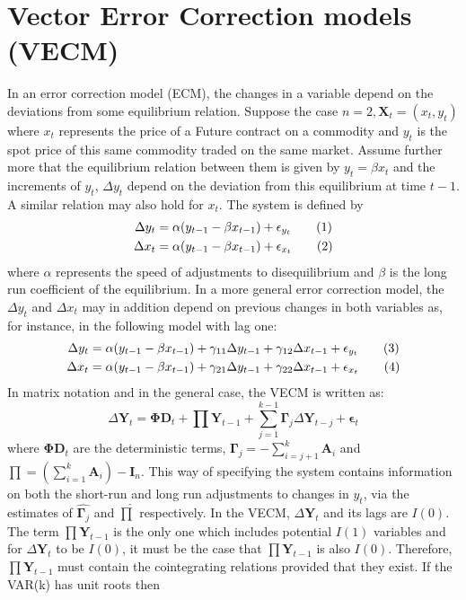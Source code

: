 \documentclass[11pt,a4,twosided,singlespacing,titlepagenumber=on]{scrreprt}
\numberwithin{equation}{chapter} %
\theoremstyle{remark}
\newcommand{\matr}[1]{\mathbf{#1}}
\newcommand\numberthis{\addtocounter{equation}{1}\tag{\theequation}}
\begin{document}
\section{Vector Error Correction models (VECM)}
In an error correction model (ECM), the changes in a variable depend on the deviations from some equilibrium relation. Suppose the case $n=2, \matr{X}_t = (x_t, y_t)$ where $x_t$ represents the price of a Future contract on a commodity and $y_t$ is the spot price of this same commodity traded on the same market. Assume further more that the equilibrium relation between them is given by $y_t = \beta x_t$ and the increments of $y_t$, $\Delta y_t$ depend on the deviation from this equilibrium at time $t-1$. A similar relation may also hold for $x_t$. The system is defined by
\begin{align*}
\Delta y_t &= \alpha (y_{t-1} - \beta x_{t-1}) + \epsilon_{y_t} \numberthis \\
\Delta x_t &= \alpha (y_{t-1} - \beta x_{t-1}) + \epsilon_{x_t} \numberthis
\end{align*}
where $\alpha$ represents the speed of adjustments to disequilibrium and $\beta$ is the long run coefficient of the equilibrium. In a more general error correction model, the $\Delta y_t$ and $\Delta x_t$ may in addition depend on previous changes in both variables as, for instance, in the following model with lag one:
\begin{align*}
\Delta y_t &= \alpha (y_{t-1} - \beta x_{t-1}) + \gamma_{11} \Delta y_{t-1} + \gamma_{12} \Delta x_{t-1} + \epsilon_{y_t} \numberthis \\
\Delta x_t &= \alpha (y_{t-1} - \beta x_{t-1}) + \gamma_{21} \Delta y_{t-1} + \gamma_{22} \Delta x_{t-1} + \epsilon_{x_t} \numberthis
\end{align*}
In matrix notation and in the general case, the VECM is written as:
\begin{equation}
\Delta \matr{Y}_t = \matr{\Phi} \matr{D}_t + \prod \matr{Y}_{t-1} + \sum_{j=1}^{k-1} \matr{\Gamma}_j \Delta \matr{Y}_{t-j} + \matr{\epsilon}_t
\end{equation}
where $\matr{\Phi} \matr{D}_t$ are the deterministic terms, $\matr{\Gamma}_j = - \sum_{i=j+1}^k \matr{A}_i$ and $\prod = \left(\sum_{i=1}^k \matr{A}_i \right) - \matr{I}_n$. This way of specifying the system contains information on both the short-run and long run adjustments to changes in $y_t$, via the estimates of $\hat{\matr{\Gamma}_j}$ and $\hat{\prod}$ respectively. In the VECM, $\Delta \matr{Y}_t$ and its lags are $I(0)$. The term $\prod \matr{Y}_{t-1}$ is the only one which includes potential $I(1)$ variables and for $\Delta \matr{Y}_t$ to be $I(0)$, it must be the case that $\prod \matr{Y}_{t-1}$ is also $I(0)$. Therefore, $\prod \matr{Y}_{t-1}$ must contain the cointegrating relations provided that they exist. If the VAR(k) has unit roots then 
\end{document}
